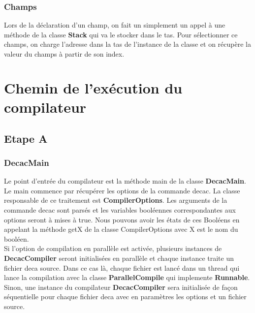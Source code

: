 \documentclass[12pt, a4paper, one side]{article}
\begin{document}
    \subsubsection{Champs}

    Lors de la déclaration d'un champ, on fait un simplement un appel à une
    méthode de la classe \textbf{Stack} qui va le stocker dans le tas. Pour
    sélectionner ce champs, on charge l'adresse dans la tas de l'instance de
    la classe et on récupère la valeur du champs à partir de son index.

    \newpage

    \section{Chemin de l'exécution du compilateur}
    \subsection{Etape A}

    \subsubsection{DecacMain}
    Le point d'entrée du compilateur est la méthode main de la classe \textbf {DecacMain}.
    Le main commence par récupérer les options de la commande decac. La classe responsable de ce
    traitement est \textbf{CompilerOptions}. Les arguments de la commande decac sont parsés et les
    variables booléennes correspondantes aux options seront à mises à true. Nous pouvons avoir les états de ces
    Booléens en appelant la méthode getX de la classe CompilerOptions avec X est le nom du booléen.
    \\
    Si l'option de compilation en parallèle est activée, plusieurs instances de \textbf{DecacCompiler} seront
    initialisées en parallèle et chaque instance traite un fichier deca source. Dans ce cas là, chaque fichier est lancé
    dans un thread qui lance la compilation avec la classe
    \textbf{ParallelCompile} qui implemente \textbf{Runnable}.
    Sinon, une instance du compilateur \textbf{DecacCompiler} sera initialisée de façon séquentielle pour
    chaque fichier deca avec en paramètres les options et un fichier source.
\end{document}
